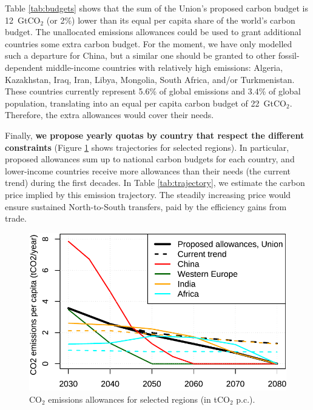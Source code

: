 \documentclass[12pt,english]{article}
\begin{document}
Table \ref{tab:budgets} shows that the sum of the Union's proposed carbon budget is 12~GtCO$_\text{2}$ (or 2\%) lower than its equal per capita share of the world's carbon budget. The unallocated emissions allowances could be used to grant additional countries some extra carbon budget. For the moment, we have only modelled such a departure for China, but a similar one should be granted to other fossil-dependent middle-income countries with relatively high emissions: Algeria, Kazakhstan, Iraq, Iran, Libya, Mongolia, South Africa, and/or Turkmenistan. These countries currently represent 5.6\% of global emissions and 3.4\% of global population, translating into an equal per capita carbon budget of 22~GtCO$_\text{2}$. Therefore, the extra allowances would cover their needs. 

Finally, \textbf{we propose yearly quotas by country that respect the different constraints} (Figure \ref{fig:trajectories} shows trajectories for selected regions). 
In particular, proposed allowances sum up to national carbon budgets for each country, and lower-income countries receive more allowances than their needs (the current trend) 
during the first decades. %
In Table \ref{tab:trajectory}, we estimate the carbon price implied by this emission trajectory. The steadily increasing price would ensure sustained North-to-South transfers, paid by the efficiency gains from trade.

\begin{figure}[h]
  \centering \caption{CO$_\text{2}$ emissions allowances for selected regions (in tCO$_\text{2}$ p.c.).\label{fig:trajectories}}
  \includegraphics[width=.7\textwidth]{../figures/policies/fossil_free_union_emission_trajectories.pdf} 
\end{figure}

\begin{table}[h!]
  \caption{Projected carbon price trajectory in the Union.\label{tab:trajectory}} 
\end{table}
\end{document}
